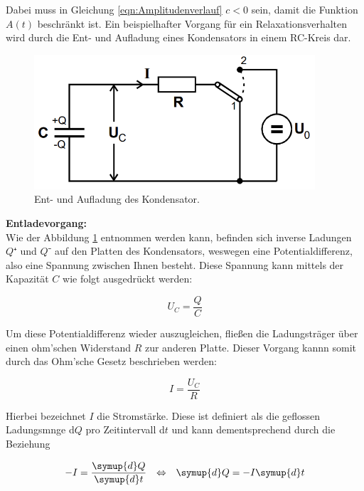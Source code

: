 \noindent Dabei muss in Gleichung \eqref{eqn:Amplitudenverlauf} $c < 0$ sein, damit die Funktion $A(t)$ beschränkt ist.
Ein beispielhafter Vorgang für ein Relaxationsverhalten wird durch die Ent- und Aufladung eines Kondensators in einem 
RC-Kreis dar.

\begin{figure}[H]
    \centering
    \includegraphics[height=5cm]{v353_Schaltkreise_1.png}
    \caption{Ent- und Aufladung des Kondensator.}
    \label{fig:Ladungsvorgang}
\end{figure}

\noindent \textbf{Entladevorgang:}\\
\noindent Wie der Abbildung \ref{fig:Ladungsvorgang} entnommen werden kann, befinden sich inverse Ladungen $Q⁺$ und $Q⁻$ auf den Platten 
des Kondensators, weswegen eine Potentialdifferenz, also eine Spannung zwischen Ihnen besteht. Diese Spannung kann mittels 
der Kapazität $C$ wie folgt ausgedrückt werden:

\begin{equation}
\label{eqn:Spannung}
    U_C = \frac{Q}{C}
\end{equation}

\noindent Um diese Potentialdifferenz wieder auszugleichen, fließen die Ladungsträger über einen ohm'schen Widerstand $R$ zur anderen Platte.
Dieser Vorgang kannn somit durch das Ohm'sche Gesetz beschrieben werden:

\begin{equation}
\label{eqn:Ohm}
    I = \frac{U_C}{R}
\end{equation}

\noindent Hierbei bezeichnet $I$ die Stromstärke. Diese ist definiert als die geflossen Ladungsmnge d$Q$ pro Zeitintervall d$t$ und kann dementsprechend
durch die Beziehung

\begin{align}
\label{eqn:Stromstaerke}
    -I &= \frac{\symup{d}Q}{\symup{d}t} &\Leftrightarrow& &\symup{d}Q = -I\symup{d}t 
\end{align}

